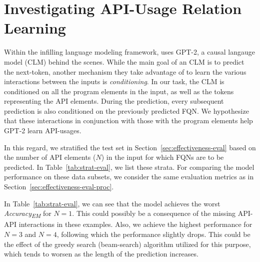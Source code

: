 \section{Investigating API-Usage Relation Learning}
\label{sec:eval}

%

Within the infilling language modeling framework, {\tool} uses GPT-2, a causal langauge model (CLM) behind the scenes. While the main goal of an CLM is to predict the next-token, another mechanism they take advantage of to learn the various interactions between the inputs is {\em conditioning}. In our task, the CLM is conditioned on all the program elements in the input, as well as the \blank tokens representing the API elements. During the prediction, every subsequent prediction is also conditioned on the previously predicted FQN. We hypothesize that these interactions in conjunction with those with the program elements help GPT-2 learn API-usages.

In this regard, we stratified the test set in Section~\ref{sec:effectiveness-eval} based on the number of API elements ($N$) in the input for which FQNs are to be predicted. In Table~\ref{tab:strat-eval}, we list these strata. For comparing the model performance on these data subsets, we consider the same evaluation metrics as in Section~\ref{sec:effectiveness-eval-proc}.

In Table~\ref{tab:strat-eval}, we can see that the model achieves the worst \textit{Accuracy\textsubscript{EM}} for $N=1$. This could possibly be a consequence of the missing API-API interactions in these examples. Also, we achieve the highest performance for $N=3$ and $N=4$, following which the performance slightly drops. This could be the effect of the greedy search (beam-search) algorithm utilized for this purpose, which tends to worsen as the length of the prediction increases. 